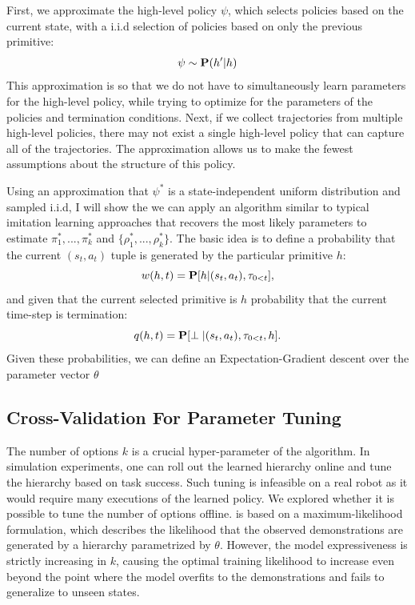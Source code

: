 
\vspace{1.0em}

First, we approximate the high-level policy $\psi$, which selects policies based on the current state, with a i.i.d selection of policies based on only the previous primitive:
\[
\psi \sim \mathbf{P}(h' \vert h)
\]
This approximation is so that we do not have to simultaneously learn parameters for the high-level policy, while trying to optimize for the parameters of the policies and termination conditions.
Next, if we collect trajectories from multiple high-level policies, there may not exist a single high-level policy that can capture all of the trajectories.
The approximation allows us to make the fewest assumptions about the structure of this policy.

Using an approximation that $\psi^*$ is a state-independent uniform distribution and sampled i.i.d, I will show the we can apply an algorithm similar to typical imitation learning approaches that recovers the most likely parameters to estimate $\pi^*_{1},...,\pi^*_{k}$ and $\{\rho^*_{1},...,\rho^*_{k}\}$. The basic idea is to define a probability that the current $(s_t,a_t)$ tuple is generated by the particular primitive $h$:
\[
w(h,t) = \mathbf{P}[h \vert (s_t, a_t), \tau_{0<t}],
\]
and given that the current selected primitive is $h$ probability that the current time-step is termination:
\[
q(h,t) = \mathbf{P}[\perp \vert (s_t, a_t), \tau_{0<t}, h].
\]
Given these probabilities, we can define an Expectation-Gradient descent over the parameter vector $\theta$

\subsection*{Cross-Validation For Parameter Tuning}
The number of options $k$ is a crucial hyper-parameter of the algorithm.
In simulation experiments, one can roll out the learned hierarchy online and tune the hierarchy based on task success.
Such tuning is infeasible on a real robot as it would require many executions of the learned policy.
We explored whether it is possible to tune the number of options offline.
\alg is based on a maximum-likelihood formulation, which describes the likelihood that the observed demonstrations are generated by a hierarchy parametrized by $\theta$.
However, the model expressiveness is strictly increasing in $k$, causing the optimal training likelihood to increase even beyond the point where the model overfits to the demonstrations and fails to generalize to unseen states.

